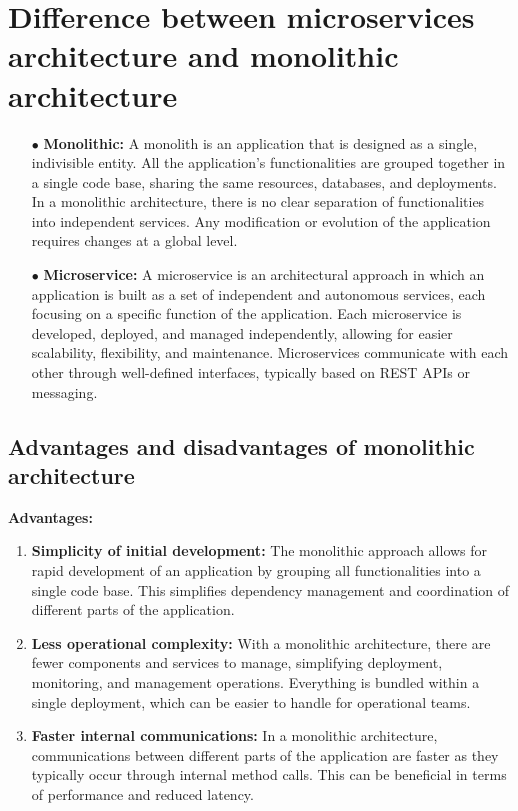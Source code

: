 \section{Difference between microservices architecture and monolithic architecture}
\begin{enumerate}
\item[$\bullet$] \textbf{Monolithic:} A monolith is an application that is designed as a single, indivisible entity. All the application's functionalities are grouped together in a single code base, sharing the same resources, databases, and deployments. In a monolithic architecture, there is no clear separation of functionalities into independent services. Any modification or evolution of the application requires changes at a global level.
\item[$\bullet$] \textbf{Microservice:} A microservice is an architectural approach in which an application is built as a set of independent and autonomous services, each focusing on a specific function of the application. Each microservice is developed, deployed, and managed independently, allowing for easier scalability, flexibility, and maintenance. Microservices communicate with each other through well-defined interfaces, typically based on REST APIs or messaging.
\end{enumerate}

\subsection{Advantages and disadvantages of monolithic architecture}
\textbf{Advantages:}
\begin{enumerate}
\item \textbf{Simplicity of initial development:} The monolithic approach allows for rapid development of an application by grouping all functionalities into a single code base. This simplifies dependency management and coordination of different parts of the application.
\item \textbf{Less operational complexity:} With a monolithic architecture, there are fewer components and services to manage, simplifying deployment, monitoring, and management operations. Everything is bundled within a single deployment, which can be easier to handle for operational teams.
\item \textbf{Faster internal communications:} In a monolithic architecture, communications between different parts of the application are faster as they typically occur through internal method calls. This can be beneficial in terms of performance and reduced latency.
\end{enumerate}

